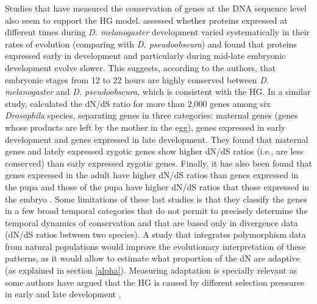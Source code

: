 Studies that have measured the conservation of genes at the DNA sequence level also seem to support the HG model.
\citet{Davis2005} assessed whether proteins expressed at different times during \textit{D.  melanogaster} development varied systematically in their rates of evolution (comparing with \textit{D. pseudoobscura}) and found that proteins expressed early in development and particularly during mid-late embryonic development evolve slower.  
This suggests, according to the authors, that embryonic stages from 12 to 22 hours are
highly conserved between \textit{D. melanogaster} and \textit{D. pseudoobscura}, which is consistent with the HG.
%
In a similar study, \citet{Mensch2013} calculated the dN/dS ratio for more than 2,000 genes among six \textit{Drosophila} species, separating genes in three categories: maternal genes (genes whose products are left by the mother in the egg), genes expressed in early development and genes expressed in late development. They found that maternal genes and lately expressed zygotic genes show higher dN/dS ratios (i.e., are less conserved) than early expressed zygotic genes.
Finally, it has also been found that genes expressed in the adult have higher dN/dS ratios than genes expressed in the pupa and those of the pupa have higher dN/dS ratios that those expressed in the embryo \citep{Artieri2009}.
%
Some limitations of these last studies is that they classify the genes in a few broad temporal categories that do not permit to precisely determine the temporal dynamics of conservation and that are based only in divergence data (dN/dS ratios between two species).
A study that integrates polymorphism data from natural populations would improve the evolutionary interpretation of these patterns, as it would allow to estimate what proportion of the dN are adaptive (as explained in section \ref{alpha}).
Measuring adaptation is specially relevant as some authors have argued that the HG is caused by different selection pressures in early and late development \citep{Slack1993,Kalinka2012,Wray2000}.

